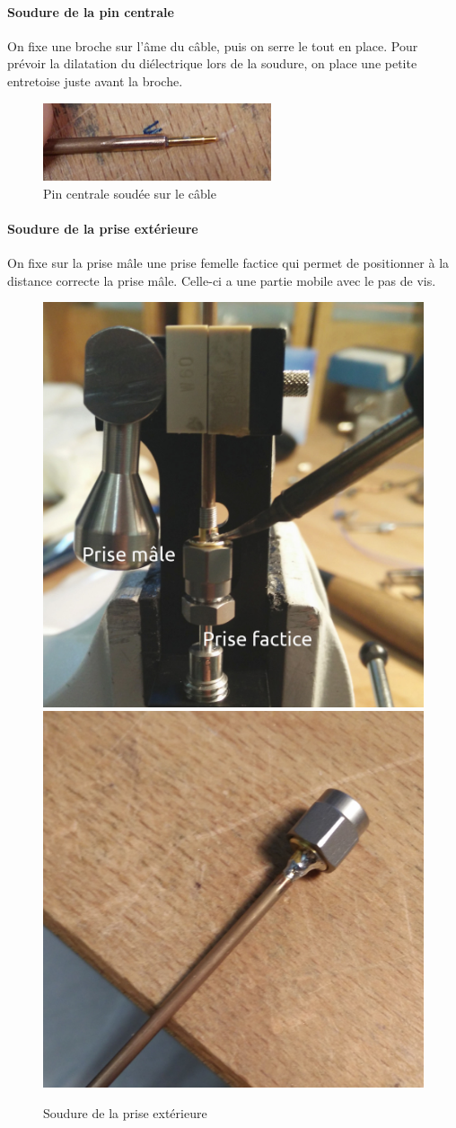 \paragraph*{Soudure de la pin centrale} On fixe une broche sur l’âme du câble, puis on serre le tout en
place. Pour prévoir la dilatation du diélectrique lors de la soudure, on place une petite entretoise juste avant la broche.
\begin{figure}[h]
    \begin{center}
        \includegraphics[width=0.60\textwidth]{Images/Coax/3}
        \caption{Pin centrale soudée sur le câble}
        \label{coax_soudure_centre}
    \end{center}
\end{figure}

\paragraph*{Soudure de la prise extérieure} On fixe sur la prise mâle une prise femelle factice qui permet de positionner à la distance correcte la prise mâle. Celle-ci a une partie mobile avec le pas de vis.
\begin{figure}[h]
    \begin{center}
        \includegraphics[height=0.48\textwidth]{Images/Coax/4}
        \quad
        \includegraphics[height=0.48\textwidth]{Images/Coax/5}
        \caption{Soudure de la prise extérieure}
        \label{coax_soudure_exterieur}
    \end{center}
\end{figure}

